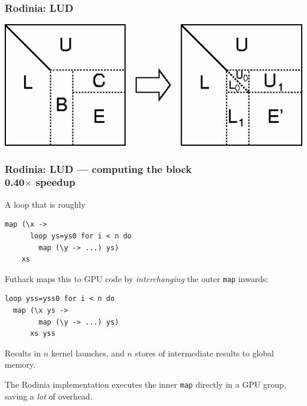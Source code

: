 \documentclass[rgb,dvipsnames]{beamer}
\begin{document}
\begin{frame}
  \frametitle{Rodinia: LUD}

  \includegraphics[width=\textwidth]{img/lud.png}


\end{frame}

\begin{frame}[fragile]
  \frametitle{Rodinia: LUD --- computing the block \\ 0.40$\times$ speedup}

  A loop that is roughly

\begin{lstlisting}
map (\x ->
      loop ys=ys0 for i < n do
        map (\y -> ...) ys)
    xs
\end{lstlisting}

  Futhark maps this to GPU code by \textit{interchanging} the outer
  \lstinline{map} inwards:

\begin{lstlisting}
loop yss=yss0 for i < n do
  map (\x ys ->
        map (\y -> ...) ys)
      xs yss
\end{lstlisting}

  Results in $n$ kernel launches, and $n$ stores of intermediate
  results to global memory.

  The Rodinia implementation executes the inner
  \lstinline{map} directly in a GPU group, saving a \textit{lot} of
  overhead.
\end{frame}
\end{document}
